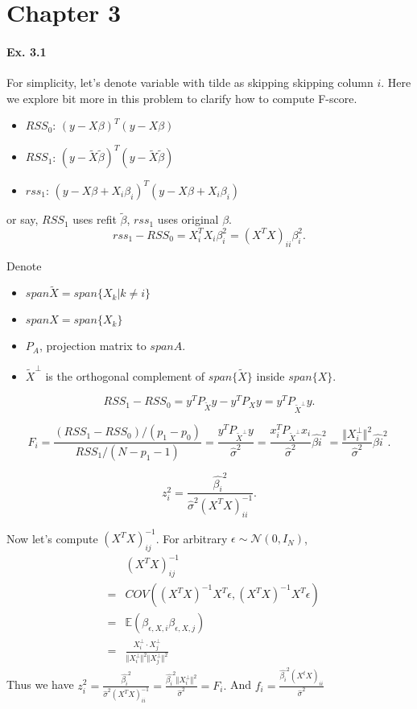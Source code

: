 
\section*{Chapter 3}
\paragraph*{Ex. 3.1}
For simplicity, let's denote variable with tilde as skipping skipping column $i$.
Here we explore bit more in this problem to clarify how to compute F-score.
\begin{itemize}
    \item $RSS_0$: $(y - X\beta)^T(y - X\beta)$
    \item $RSS_1$: $(y - \tilde{X}\tilde{\beta})^T(y - \tilde{X}\tilde{\beta})$
    \item $rss_1$: $(y - X\beta + X_i\beta_i)^T(y - X\beta + X_i\beta_i)$
\end{itemize}

or say, $RSS_1$ uses refit $\tilde{\beta}$, $rss_1$ uses original $\beta$.
$$rss_1 - RSS_0 = X_i^TX_i\beta_i^2 = (X^TX)_{ii}\beta_{i}^2.$$

Denote
\begin{itemize}
    \item $span{\tilde{X}} = span\{X_{k}|k\neq i\}$
    \item $span{X} = span\{X_{k}\}$
    \item $P_{A}$, projection matrix to $span{A}.$
    \item $\tilde{X}^{\perp}$ is the orthogonal complement of $span\{\tilde{X}\}$ inside $span\{X\}$.
\end{itemize}

$$RSS_1 - RSS_0=y^T P_{\tilde{X}}y - y^T P_{X}y=y^T P_{\tilde{X}^{\perp}}y.$$

$$F_{i} = \frac{(RSS_1 - RSS_0)/(p_1 - p_0)}{RSS_1 / (N - p_1 -1)}=\frac{y^T P_{\tilde{X}^{\perp}}y}{\hat{\sigma}^2}=\frac{x_{i}^T P_{\tilde{X}^{\perp}}x_{i}}{\hat{\sigma}^2}\hat{\beta{i}}^2=\frac{\Vert X_{i}^{\perp}\Vert^2}{\hat{\sigma}^2}\hat{\beta{i}}^2.$$

$$z_{i}^2 = \frac{\hat{\beta_i}^2}{\hat{\sigma}^2(X^TX)^{-1}_{ii}}.$$

Now let's compute $(X^TX)^{-1}_{ij}$. For arbitrary $\epsilon\sim\mathcal{N}(0, I_{N})$,
\begin{eqnarray*}
    & &(X^TX)^{-1}_{ij}\\
    &=& COV\left((X^TX)^{-1}X^T \epsilon, (X^TX)^{-1}X^T \epsilon\right)\\
    &=& \mathbb{E}(\beta_{\epsilon, X, {i}} \beta_{\epsilon, X, {j}})\\
    &=& \frac{X_{i}^{\perp}\cdot X_{j}^{\perp}}{\Vert X_{i}^{\perp}\Vert^2 \Vert X_{j}^{\perp}\Vert^2}
\end{eqnarray*}
Thus we have $z_{i}^2 = \frac{\hat{\beta_i}^2}{\hat{\sigma}^2(X^TX)^{-1}_{ii}}= \frac{\hat{\beta_i}^2\Vert X_{i}^{\perp}\Vert^2}{\hat{\sigma}^2}=F_{i}.$ And $f_{i}=\frac{\hat{\beta_i}^2(X^tX)_{ii}}{\hat{\sigma}^2}$


